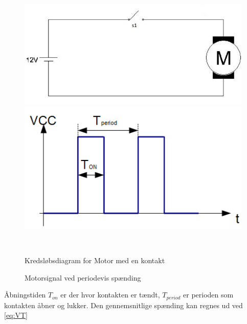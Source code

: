  \begin{figure}[htbp] \centering
\begin{minipage}[b]{0.48\textwidth} \centering
\includegraphics[width=1.00\textwidth]{billeder/Hardware/motorkontakt.jpg} %
\end{minipage} \hfill
\begin{minipage}[b]{0.48\textwidth} \centering
\includegraphics[width=1.00\textwidth]{billeder/Hardware/onoffwave.jpg} %
\end{minipage} \\ %
\begin{minipage}[t]{0.48\textwidth}
\caption{Kredsløbsdiagram for Motor med en kontakt} %
\label{fig:motorkontakt}
\end{minipage} \hfill
\begin{minipage}[t]{0.48\textwidth}
\caption{Motorsignal ved periodevis spænding } %
\label{fig:onoffwave}
\end{minipage}
\end{figure}
Åbningstiden $T_{on}$ er der hvor kontakten er tændt, $T_{period}$ er perioden som kontakten åbner og lukker. Den gennemsnitlige spænding kan regnes ud ved \ref{eq:VT}

